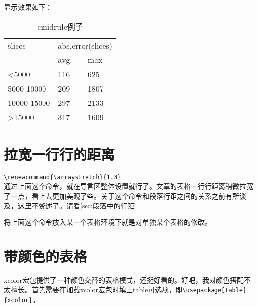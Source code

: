 \documentclass[11pt,oneside]{book}
\begin{document}
  显示效果如下：
  \begin{table}[H]
    \centering
    \begin{tabular}{@{}lll@{}}
      \toprule
      slices      & \multicolumn{2}{l}{abs.error(slices)} \\ \cmidrule(l){2-3}
                  & avg.              & max               \\ \midrule
      <5000       & 116               & 625               \\
      5000-10000  & 209               & 1807              \\
      10000-15000 & 297               & 2133              \\
      >15000      & 317               & 1609              \\ \bottomrule
    \end{tabular}
    \caption{cmidrule例子}
    \label{tab:cmidrule例子}
  \end{table}



  \section{拉宽一行行的距离}
  \verb+\renewcommand{\arraystretch}{1.3}+\\
  通过上面这个命令，就在导言区整体设置就行了。文章的表格一行行距离稍微拉宽了一点，看上去更加美观了些。关于这个命令和段落行距之间的关系之前有所谈及，这里不赘述了。请看\ref{sec:段落中的行距}

  将上面这个命令放入某一个表格环境下就是对单独某个表格的修改。

  \section[带颜色的表格]{带颜色的表格}
  \label{sec:带颜色的表格}
  xcolor宏包提供了一种颜色交替的表格模式，还挺好看的。好吧，我对颜色搭配不太擅长。首先需要在加载xcolor宏包时填上table可选项，即\verb+\usepackage[table]{xcolor}+。

  \begin{table}[H]
    \centering
    \caption{带颜色的表格}
    \label{tab:带颜色的表格}
  \end{table}
\end{document}
